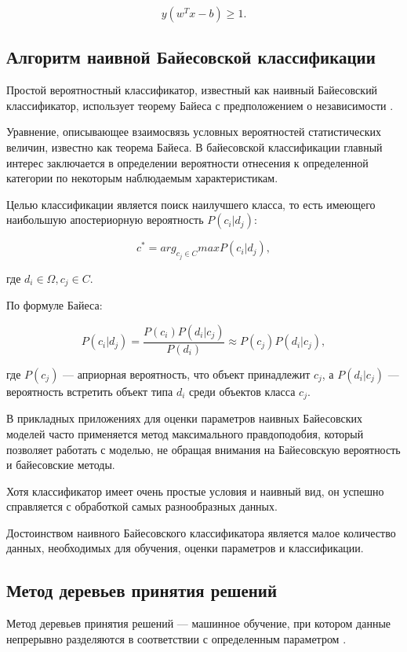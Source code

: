 \begin{equation}
	\label{eq:nn11}
	y(w^Tx-b) \geq 1.
\end{equation}

\subsection{Алгоритм наивной Байесовской классификации}

Простой вероятностный классификатор, известный как наивный Байесовский классификатор, использует теорему Байеса с предположением о независимости \cite[]{twelve}.

Уравнение, описывающее взаимосвязь условных вероятностей статистических величин, известно как теорема Байеса. В байесовской классификации главный интерес заключается в определении вероятности отнесения к определенной категории по некоторым наблюдаемым характеристикам.

Целью классификации является поиск наилучшего класса, то есть имеющего наибольшую апостериорную вероятность $P(c_i|d_j)$:

\begin{equation}
	\label{eq:nn12}
    c^* = arg_{c_j \in C} maxP(c_i|d_j),
\end{equation}

где $d_i \in \Omega, c_j \in C$.

По формуле Байеса:

\begin{equation}
	\label{eq:nn13}
    P(c_i|d_j) = \frac{P(c_i)P(d_i|c_j)}{P(d_i)} \approx P(c_j)P(d_i|c_j), 
\end{equation}

где $P(c_j)$ --- априорная вероятность, что объект принадлежит $c_j$, а $P(d_i|c_j)$ --- вероятность встретить объект типа $d_i$ среди объектов класса $c_j$.

В прикладных приложениях для оценки параметров наивных Байесовских моделей часто применяется метод максимального правдоподобия, который позволяет работать с моделью, не обращая внимания на Байесовскую вероятность и байесовские методы.

Хотя классификатор имеет очень простые условия и наивный вид, он успешно справляется с обработкой самых разнообразных данных.

Достоинством наивного Байесовского классификатора является малое количество данных, необходимых для обучения, оценки параметров и классификации.



\subsection{Метод деревьев принятия решений}
Метод деревьев принятия решений --- машинное обучение, при котором
данные непрерывно разделяются в соответствии с определенным параметром \cite[]{classifiers}.

